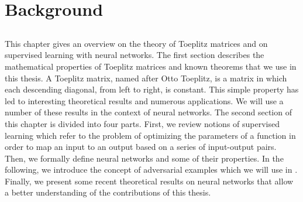 \chapter{Background}
\label{chapter:ch2-background}
\localtoc

\section*{}

This chapter gives an overview on the theory of Toeplitz matrices and on supervised learning with neural networks.
The first section describes the mathematical properties of Toeplitz matrices and known theorems that we use in this thesis.
A Toeplitz matrix, named after Otto Toeplitz, is a matrix in which each descending diagonal, from left to right, is constant.
This simple property has led to interesting theoretical results and numerous applications.
We will use a number of these results in the context of neural networks.
The second section of this chapter is divided into four parts.
First, we review notions of supervised learning which refer to the problem of optimizing the parameters of a function in order to map an input to an output based on a series of input-output pairs.
Then, we formally define neural networks and some of their properties.
In the following, we introduce the concept of adversarial examples which we will use in .
Finally, we present some recent theoretical results on neural networks that allow a better understanding of the contributions of this thesis.




